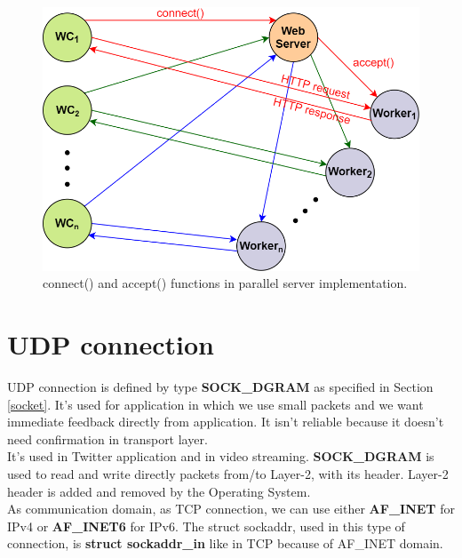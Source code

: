 \begin{figure}[H]
\centering
\includegraphics[scale=0.4]{Images/NetworkC/connect_accept}
\caption{\footnotesize{connect() and accept() functions in parallel server implementation.}}\label{connect_accept}
\end{figure}

\section{UDP connection}
UDP connection is defined by type \textbf{SOCK\_DGRAM} as specified in Section \ref{socket}. It's used for application in which we use small packets and we want immediate feedback directly from application. It isn't reliable because it doesn't need confirmation in transport layer.\\
It's used in Twitter application and in video streaming. \textbf{SOCK\_DGRAM} is used to read and write directly packets from/to Layer-2, with its header. Layer-2 header is added and removed by the Operating System.\\
As communication domain, as TCP connection, we can use either \textbf{AF_INET} for IPv4 or \textbf{AF_INET6} for IPv6. The struct sockaddr, used in this type of connection, is \textbf{struct sockaddr_in} like in TCP because of AF_INET domain.\\

